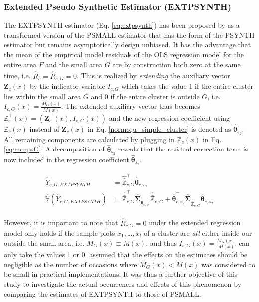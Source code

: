\documentclass[remotesensing,article,submit,moreauthors,pdftex,10pt,a4paper]{mdpi}
\newcommand{\psynth}{PSYNTH}
\newcommand{\psmall}{PSMALL}
\newcommand{\extpsynth}{EXTPSYNTH}
\newcommand{\var}{\mathbb{V}}
\begin{document}
\subsubsection{Extended Pseudo Synthetic Estimator (\extpsynth{})}
\label{sec:extpsynth}

The \extpsynth{} estimator (Eq. \ref{eq:extpsynth}) has been proposed by \cite{mandallaz2013a} as a transformed version of the \psmall{} estimator that has the form of the \psynth{} estimator but remains asymptotically design unbiased. It has the advantage that the mean of the empirical model residuals of the OLS regression model for the entire area $F$ and the small area $G$ are by construction both zero at the same time, i.e. $\bar{\hat{R}}_{c} = \bar{\hat{R}}_{c,G} = 0$. This is realized by \textit{extending} the auxiliary vector $\pmb{Z}_{c}(x)$ by the indicator variable $I_{c,G}$ which takes the value 1 if the entire cluster lies within the small area $G$ and 0 if the entire cluster is outside $G$, i.e. $I_{c,G}(x)=\frac{M_{G}(x)}{M(x)}$. The extended auxiliary vector thus becomes $\pmb{\mathbb{Z}}_{c}^{\top}(x)= (\pmb{Z}_{c}^{\top}(x),I_{c,G}(x))$ and the new regression coefficient using $\pmb{\mathbb{Z}}_{c}(x)$ instead of $\pmb{Z}_{c}(x)$ in Eq. \ref{normequ_simple_cluster} is denoted as $\hat{\pmb{\theta}}_{s_2}$. All remaining components are calculated by plugging in $\pmb{\mathbb{Z}}_{c}(x)$ in Eq. \ref{eq:compsG}. A decomposition of $\hat{\pmb{\theta}}_{s_2}$ reveals that the residual correction term is now included in the regression coefficient $\hat{\pmb{\theta}}_{s_2}$.

\begin{subequations}\label{eq:extpsynth}
	\begin{align}
	\hat{Y}_{c,G,EXTPSYNTH} & =\hat{\bar{\pmb{\mathbb{Z}}}}_{c,G}^{\top}\hat{\pmb{\theta}}_{c,s_2} \label{eq:extpsynth_pest} \\
	\hat{\var}(\hat{Y}_{c,G,EXTPSYNTH})& =
	\hat{\bar{\pmb{\mathbb{Z}}}}_{c,G}^{\top}\hat{\pmb{\Sigma}}_{\hat{\pmb{\theta}}_{c,s_2}}
	\hat{\bar{\pmb{\mathbb{Z}}}}_{c,G}
	+ \hat{\pmb{\theta}}^{\top}_{c,s_2}\hat{\pmb{\Sigma}}_{\hat{\bar{\pmb{\mathbb{Z}}}}_{c,G}}\hat{\pmb{\theta}}_{c,s_2} \label{eq:extpsynth_var}
	\end{align}
\end{subequations}

However, it is important to note that $\bar{\hat{R}}_{c,G} = 0$ under the extended regression model only holds if the sample plots $x_1, ..., x_l$ of a cluster are \textit{all} either inside our outside the small area, i.e. $M_G(x)\equiv M(x)$, and thus $I_{c,G}(x)=\frac{M_{G}(x)}{M(x)}$ can only take the values 1 or 0. \citet{mandallaz2016} assumed that the effects on the estimates should be negligible as the number of occasions where $M_{G}(x) < M(x)$ was considered to be small in practical implementations. It was thus a further objective of this study to investigate the actual occurrences and effects of this phenomenon by comparing the estimates of \extpsynth{} to those of \psmall{}. %
\end{document}
